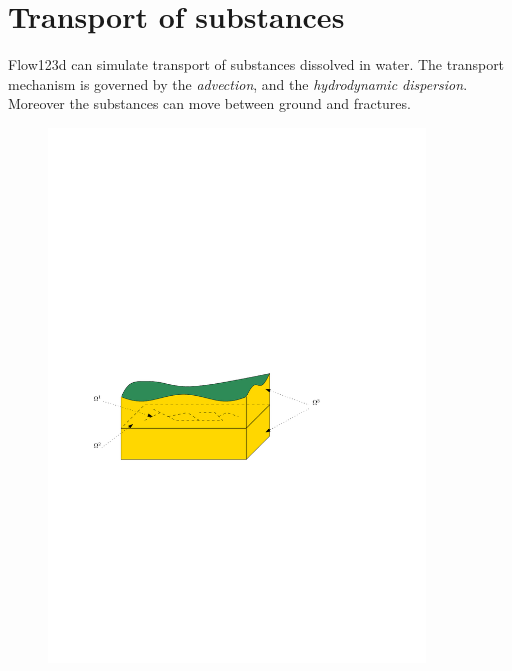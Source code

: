 \documentclass[a4paper]{article}
\begin{document}
\section{Transport of substances}

Flow123d can simulate transport of substances dissolved in water.
The transport mechanism is governed by the \emph{advection}, and the \emph{hydrodynamic dispersion}.
Moreover the substances can move between ground and fractures.
\begin{figure}[h]
\centering
\includegraphics[width=10cm]{ground_fractures}
\end{figure}
\end{document}
